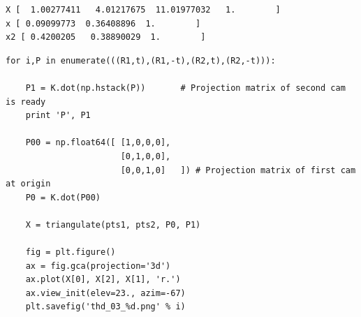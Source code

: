 \documentclass[12pt,fleqn]{article}\usepackage{../../common}
\begin{document}
\begin{verbatim}
X [  1.00277411   4.01217675  11.01977032   1.        ]
x [ 0.09099773  0.36408896  1.        ]
x2 [ 0.4200205   0.38890029  1.        ]
\end{verbatim}


\begin{verbatim}
for i,P in enumerate(((R1,t),(R1,-t),(R2,t),(R2,-t))):

    P1 = K.dot(np.hstack(P))       # Projection matrix of second cam is ready
    print 'P', P1

    P00 = np.float64([ [1,0,0,0],
                       [0,1,0,0],
                       [0,0,1,0]   ]) # Projection matrix of first cam at origin
    P0 = K.dot(P00) 

    X = triangulate(pts1, pts2, P0, P1)

    fig = plt.figure()
    ax = fig.gca(projection='3d')    
    ax.plot(X[0], X[2], X[1], 'r.')
    ax.view_init(elev=23., azim=-67)
    plt.savefig('thd_03_%d.png' % i)
\end{verbatim}
\end{document}
